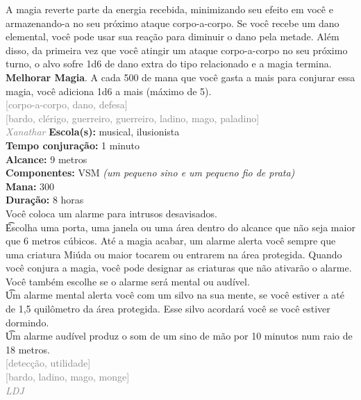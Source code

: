 \documentclass{RPG_Adventure}[2021/10/20]
\begin{document}
{\normalsize A magia reverte parte da energia recebida, minimizando seu efeito em você e armazenando-a no seu próximo ataque corpo-a-corpo. Se você recebe um dano elemental, você pode usar sua reação para diminuir o dano pela metade. Além disso, da primeira vez que você atingir um ataque corpo-a-corpo no seu próximo turno, o alvo sofre 1d6 de dano extra do tipo relacionado e a magia termina.\\\t \textbf{Melhorar Magia}. A cada 500 de mana que você gasta a mais para conjurar essa magia, você adiciona 1d6 a mais (máximo de 5).\\}
{\scriptsize \textcolor{gray}{[corpo-a-corpo, dano, defesa]\\}}
{\scriptsize \textcolor{gray}{[bardo, clérigo, guerreiro, guerreiro, ladino, mago, paladino]\\}}
{\tiny \textcolor{gray}{\textit{Xanathar}}}
{\small \t \textbf{Escola(s):} musical, ilusionista\\\t \textbf{Tempo conjuração:} 1 minuto\\\t \textbf{Alcance:} 9 metros\\\t \textbf{Componentes:} VSM \textit{(um pequeno sino e um pequeno fio de prata)}\\\t \textbf{Mana:} 300\\\t \textbf{Duração:} 8 horas\\}
{\normalsize Você coloca um alarme para intrusos desavisados.\\\t Escolha uma porta, uma janela ou uma área dentro do alcance que não seja maior que 6 metros cúbicos. Até a magia acabar, um alarme alerta você sempre que uma criatura Miúda ou maior tocarem ou entrarem na área protegida. Quando você conjura a magia, você pode designar as criaturas que não ativarão o alarme. Você também escolhe se o alarme será mental ou audível.\\\t Um alarme mental alerta você com um silvo na sua mente, se você estiver a até de 1,5 quilômetro da área protegida. Esse silvo acordará você se você estiver dormindo.\\\t Um alarme audível produz o som de um sino de mão por 10 minutos num raio de 18 metros. \\}
{\scriptsize \textcolor{gray}{[detecção, utilidade]\\}}
{\scriptsize \textcolor{gray}{[bardo, ladino, mago, monge]\\}}
{\tiny \textcolor{gray}{\textit{LDJ}}}
\end{document}
